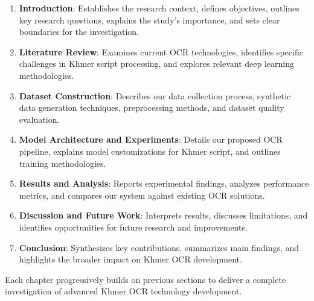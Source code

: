 \begin{enumerate}
   \item \textbf{Introduction}: Establishes the research context, defines objectives, outlines key research questions, explains the study's importance, and sets clear boundaries for the investigation.
   
   \item \textbf{Literature Review}: Examines current OCR technologies, identifies specific challenges in Khmer script processing, and explores relevant deep learning methodologies.
   
   \item \textbf{Dataset Construction}: Describes our data collection process, synthetic data generation techniques, preprocessing methods, and dataset quality evaluation.
   
   \item \textbf{Model Architecture and Experiments}: Details our proposed OCR pipeline, explains model customizations for Khmer script, and outlines training methodologies.
   
   \item \textbf{Results and Analysis}: Reports experimental findings, analyzes performance metrics, and compares our system against existing OCR solutions.
   
   \item \textbf{Discussion and Future Work}: Interprets results, discusses limitations, and identifies opportunities for future research and improvements.
   
   \item \textbf{Conclusion}: Synthesizes key contributions, summarizes main findings, and highlights the broader impact on Khmer OCR development.
\end{enumerate}

Each chapter progressively builds on previous sections to deliver a complete investigation of advanced Khmer OCR technology development.